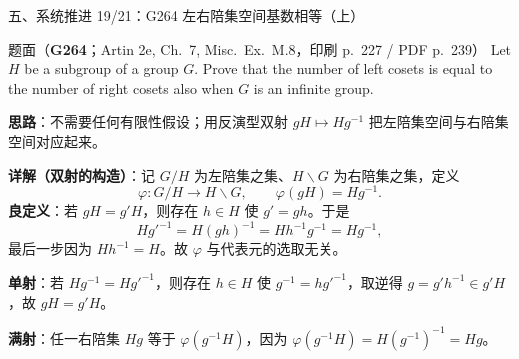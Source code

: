 \documentclass[aspectratio=169,10pt,fontset=none]{ctexbeamer}
\newcommand{\ex}[1]{\textcolor{accent}{\footnotesize\bfseries #1}}
\newcommand{\key}[1]{\textcolor{ink}{\bfseries #1}}
\begin{document}
\begin{frame}[t]{五、系统推进 19/21：G264 左右陪集空间基数相等（上）}
\label{ex:G264}
\scriptsize
\begin{block}{\footnotesize 题面（\ex{G264}；Artin 2e, Ch.~7, Misc.\ Ex.~M.8，印刷 p.~227 / PDF p.~239）}
Let $H$ be a subgroup of a group $G$. Prove that the number of left cosets is equal to the number of right cosets also when $G$ is an infinite group.
\end{block}
\key{思路}：不需要任何有限性假设；用反演型双射 $gH\mapsto Hg^{-1}$ 把左陪集空间与右陪集空间对应起来。

\key{详解（双射的构造）}：记 $G/H$ 为左陪集之集、$H\backslash G$ 为右陪集之集，定义
\[ \varphi:G/H\longrightarrow H\backslash G,\qquad \varphi(gH)=Hg^{-1}. \]
\textbf{良定义}：若 $gH=g'H$，则存在 $h\in H$ 使 $g'=gh$。于是
\[ H g'^{-1}=H(gh)^{-1}=Hh^{-1}g^{-1}=Hg^{-1}, \]
最后一步因为 $Hh^{-1}=H$。故 $\varphi$ 与代表元的选取无关。

\textbf{单射}：若 $Hg^{-1}=Hg'^{-1}$，则存在 $h\in H$ 使 $g^{-1}=hg'^{-1}$，取逆得 $g=g'h^{-1}\in g'H$，故 $gH=g'H$。

\textbf{满射}：任一右陪集 $Hg$ 等于 $\varphi(g^{-1}H)$，因为 $\varphi(g^{-1}H)=H(g^{-1})^{-1}=Hg$。
\end{frame}
\end{document}
